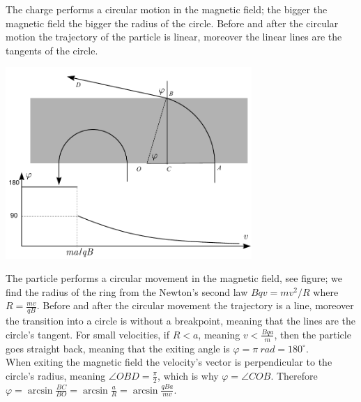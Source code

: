 \hinteng
The charge performs a circular motion in the magnetic field; the bigger the magnetic field the bigger the radius of the circle. Before and after the circular motion the trajectory of the particle is linear, moreover the linear lines are the tangents of the circle.

\solueng
\begin{center}
\includegraphics[width=0.7\textwidth]{2015-v2g-09-magnetvalilah}
\end{center}
The particle performs a circular movement in the magnetic field, see figure; we find the radius of the ring from the Newton’s second law $Bqv=mv^2/R$ where $R=\frac{mv}{qB}$. Before and after the circular movement the trajectory is a line, moreover the transition into a circle is without a breakpoint, meaning that the lines are the circle’s tangent. For small velocities, if $R<a$, meaning $v<\frac{Bqa}{m}$, then the particle goes straight back, meaning that the exiting angle is $\varphi=\pi \SI{}{rad}=180^\circ$.\\
When exiting the magnetic field the velocity’s vector is perpendicular to the circle’s radius, meaning $\angle OBD=\frac \pi 2$, which is why $\varphi=\angle COB$. Therefore $\varphi=\arcsin \frac{BC}{BO}=\arcsin \frac{a}{R}=\arcsin \frac{qBa}{mv}$.
\probend